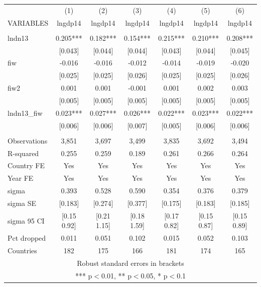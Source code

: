 \begin{tabular}{lcccccc} \hline
 & (1) & (2) & (3) & (4) & (5) & (6) \\
VARIABLES & lngdp14 & lngdp14 & lngdp14 & lngdp14 & lngdp14 & lngdp14 \\ \hline
 &  &  &  &  &  &  \\
lndn13 & 0.205*** & 0.182*** & 0.154*** & 0.215*** & 0.210*** & 0.208*** \\
 & [0.043] & [0.044] & [0.044] & [0.043] & [0.044] & [0.045] \\
fiw & -0.016 & -0.016 & -0.012 & -0.014 & -0.019 & -0.020 \\
 & [0.025] & [0.025] & [0.026] & [0.025] & [0.025] & [0.026] \\
fiw2 & 0.001 & 0.001 & -0.001 & 0.001 & 0.002 & 0.003 \\
 & [0.005] & [0.005] & [0.005] & [0.005] & [0.005] & [0.005] \\
lndn13\_fiw & 0.023*** & 0.027*** & 0.026*** & 0.022*** & 0.023*** & 0.022*** \\
 & [0.006] & [0.006] & [0.007] & [0.005] & [0.006] & [0.006] \\
 &  &  &  &  &  &  \\
Observations & 3,851 & 3,697 & 3,499 & 3,835 & 3,692 & 3,494 \\
R-squared & 0.255 & 0.259 & 0.189 & 0.261 & 0.266 & 0.264 \\
Country FE & Yes & Yes & Yes & Yes & Yes & Yes \\
Year FE & Yes & Yes & Yes & Yes & Yes & Yes \\
sigma & 0.393 & 0.528 & 0.590 & 0.354 & 0.376 & 0.379 \\
sigma SE & [0.183] & [0.274] & [0.377] & [0.175] & [0.183] & [0.185] \\
sigma 95 CI & [0.15 0.92] & [0.21 1.15] & [0.18 1.59] & [0.17 0.82] & [0.15 0.87] & [0.15 0.89] \\
Pct dropped & 0.011 & 0.051 & 0.102 & 0.015 & 0.052 & 0.103 \\
 Countries & 182 & 175 & 166 & 181 & 174 & 165 \\ \hline
\multicolumn{7}{c}{ Robust standard errors in brackets} \\
\multicolumn{7}{c}{ *** p$<$0.01, ** p$<$0.05, * p$<$0.1} \\
\end{tabular}
